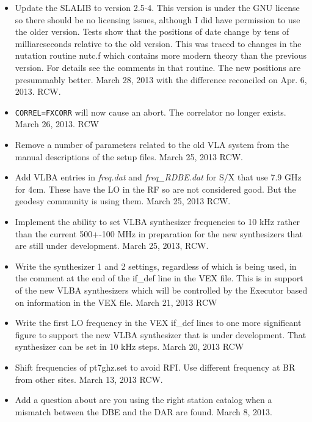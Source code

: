 \documentclass{report}
\begin{document}
\begin{itemize}
\item Update the SLALIB to version 2.5-4.  This version is under the
GNU license so there should be no licensing issues, although I did 
have permission to use the older version.  Tests show that the positions
of date change by tens of milliarcseconds relative to the old version.
This was traced to changes in the nutation routine nutc.f which contains
more modern theory than the previous version.  For details see the 
comments in that routine.  The new positions are presummably better.
March 28, 2013 with the difference reconciled on Apr. 6, 2013.  RCW.

\item {\tt CORREL=FXCORR} will now cause an abort.  The correlator no
longer exists.  March 26, 2013.  RCW

\item Remove a number of parameters related to the old VLA system
from the manual descriptions of the setup files.  March 25, 2013 RCW.

\item Add VLBA entries in {\sl freq.dat} and {\sl freq\_RDBE.dat} for
S/X that use 7.9 GHz for 4cm.  These have the LO in the RF so are
not considered good.  But the geodesy community is using them.
March 25, 2013  RCW.

\item Implement the ability to set VLBA synthesizer frequencies
to 10 kHz rather than the current 500+-100 MHz in preparation for
the new synthesizers that are still under development.  March 25, 2013,
RCW.

\item Write the synthesizer 1 and 2 settings, regardless of which
is being used, in the comment at the end of the if\_def line in the
VEX file.  This is in support of the new VLBA synthesizers which will
be controlled by the Executor based on information in the VEX file.
March 21, 2013  RCW

\item Write the first LO frequency in the VEX if\_def lines to one
more significant figure to support the new VLBA synthesizer that is
under development.  That synthesizer can be set in 10 kHz steps.
March 20, 2013  RCW

\item Shift frequencies of pt7ghz.set to avoid RFI.  Use different
frequency at BR from other sites.  March 13, 2013  RCW.

\item Add a question about are you using the right station catalog
when a mismatch between the DBE and the DAR are found.  March 8, 2013.


\end{itemize}
\end{document}

